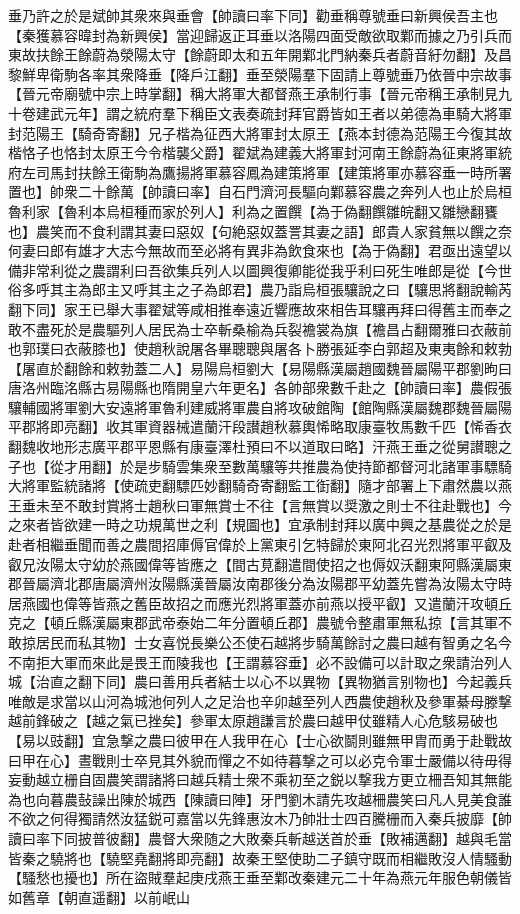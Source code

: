 垂乃許之於是斌帥其衆來與垂會【帥讀曰率下同】勸垂稱尊號垂曰新興侯吾主也【秦獲慕容暐封為新興侯】當迎歸返正耳垂以洛陽四面受敵欲取鄴而據之乃引兵而東故扶餘王餘蔚為滎陽太守【餘蔚即太和五年開鄴北門納秦兵者蔚音紆勿翻】及昌黎鮮卑衛駒各率其衆降垂【降戶江翻】垂至滎陽羣下固請上尊號垂乃依晉中宗故事【晉元帝廟號中宗上時掌翻】稱大將軍大都督燕王承制行事【晉元帝稱王承制見九十卷建武元年】謂之統府羣下稱臣文表奏疏封拜官爵皆如王者以弟德為車騎大將軍封范陽王【騎奇寄翻】兄子楷為征西大將軍封太原王【燕本封德為范陽王今復其故楷恪子也恪封太原王今令楷襲父爵】翟斌為建義大將軍封河南王餘蔚為征東將軍統府左司馬封扶餘王衛駒為鷹揚將軍慕容鳳為建策將軍【建策將軍亦慕容垂一時所署置也】帥衆二十餘萬【帥讀曰率】自石門濟河長驅向鄴慕容農之奔列人也止於烏桓魯利家【魯利本烏桓種而家於列人】利為之置饌【為于偽翻饌雛皖翻又雛戀翻饔也】農笑而不食利謂其妻曰惡奴【句絶惡奴蓋詈其妻之語】郎貴人家貧無以饌之奈何妻曰郎有雄才大志今無故而至必將有異非為飲食來也【為于偽翻】君亟出遠望以備非常利從之農謂利曰吾欲集兵列人以圖興復卿能從我乎利曰死生唯郎是從【今世俗多呼其主為郎主又呼其主之子為郎君】農乃詣烏桓張驤說之曰【驤思將翻說輸芮翻下同】家王已舉大事翟斌等咸相推奉遠近響應故來相告耳驤再拜曰得舊主而奉之敢不盡死於是農驅列人居民為士卒斬桑榆為兵裂襜裳為旗【襜昌占翻爾雅曰衣蔽前也郭璞曰衣蔽膝也】使趙秋說屠各畢聰聰與屠各卜勝張延李白郭超及東夷餘和敕勃【屠直於翻餘和敕勃蓋二人】易陽烏桓劉大【易陽縣漢屬趙國魏晉屬陽平郡劉昫曰唐洛州臨洺縣古易陽縣也隋開皇六年更名】各帥部衆數千赴之【帥讀曰率】農假張驤輔國將軍劉大安遠將軍魯利建威將軍農自將攻破館陶【館陶縣漢屬魏郡魏晉屬陽平郡將即亮翻】收其軍資器械遣蘭汗段讃趙秋慕輿悕略取康臺牧馬數千匹【悕香衣翻魏收地形志廣平郡平恩縣有康臺澤杜預曰不以道取曰略】汗燕王垂之從舅讃聰之子也【從才用翻】於是步騎雲集衆至數萬驤等共推農為使持節都督河北諸軍事驃騎大將軍監統諸將【使疏吏翻驃匹妙翻騎奇寄翻監工衘翻】隨才部署上下肅然農以燕王垂未至不敢封賞將士趙秋曰軍無賞士不往【言無賞以奨激之則士不往赴戰也】今之來者皆欲建一時之功規萬世之利【規圖也】宜承制封拜以廣中興之基農從之於是赴者相繼垂聞而善之農間招庫傉官偉於上黨東引乞特歸於東阿北召光烈將軍平叡及叡兄汝陽太守幼於燕國偉等皆應之【間古莧翻遣間使招之也傉奴沃翻東阿縣漢屬東郡晉屬濟北郡唐屬濟州汝陽縣漢晉屬汝南郡後分為汝陽郡平幼蓋先嘗為汝陽太守時居燕國也偉等皆燕之舊臣故招之而應光烈將軍蓋亦前燕以授平叡】又遣蘭汗攻頓丘克之【頓丘縣漢屬東郡武帝泰始二年分置頓丘郡】農號令整肅軍無私掠【言其軍不敢掠居民而私其物】士女喜悦長樂公丕使石越將步騎萬餘討之農曰越有智勇之名今不南拒大軍而來此是畏王而陵我也【王謂慕容垂】必不設備可以計取之衆請治列人城【治直之翻下同】農曰善用兵者結士以心不以異物【異物猶言别物也】今起義兵唯敵是求當以山河為城池何列人之足治也辛卯越至列人西農使趙秋及參軍綦母滕撃越前鋒破之【越之氣已挫矣】參軍太原趙謙言於農曰越甲仗雖精人心危駭易破也【易以豉翻】宜急撃之農曰彼甲在人我甲在心【士心欲鬬則雖無甲胄而勇于赴戰故曰甲在心】晝戰則士卒見其外貌而憚之不如待暮撃之可以必克令軍士嚴備以待毋得妄動越立栅自固農笑謂諸將曰越兵精士衆不乘初至之鋭以撃我方更立柵吾知其無能為也向暮農鼔譟出陳於城西【陳讀曰陣】牙門劉木請先攻越柵農笑曰凡人見美食誰不欲之何得獨請然汝猛鋭可嘉當以先鋒惠汝木乃帥壯士四百騰栅而入秦兵披靡【帥讀曰率下同披普彼翻】農督大衆随之大敗秦兵斬越送首於垂【敗補邁翻】越與毛當皆秦之驍將也【驍堅堯翻將即亮翻】故秦王堅使助二子鎮守既而相繼敗沒人情騷動【騷愁也擾也】所在盜賊羣起庚戌燕王垂至鄴改秦建元二十年為燕元年服色朝儀皆如舊章【朝直遥翻】以前岷山